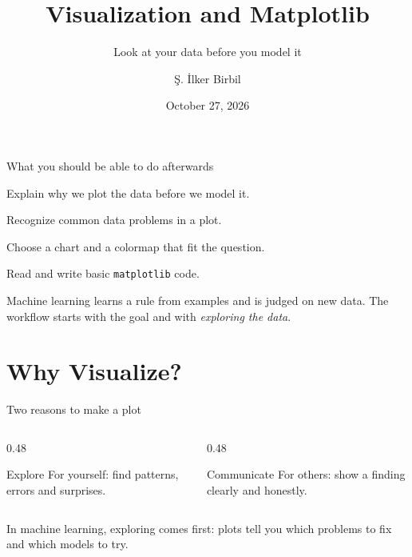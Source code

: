 \documentclass[handout,aspectratio=169,t,9pt]{beamer}
\title{Visualization and Matplotlib}
\subtitle{Look at your data before you model it}
\author{\c{S}. \.{I}lker Birbil}
\institute{University of Amsterdam}
\date{October 27, 2026}
\begin{document}

\sibtitleframe


\begin{frame}{What you should be able to do afterwards}
  \begin{objectives}
    \item Explain why we plot the data before we model it.
    \item Recognize common data problems in a plot.
    \item Choose a chart and a colormap that fit the question.
    \item Read and write basic \texttt{matplotlib} code.
  \end{objectives}

  \vfill
  \begin{recap}
    Machine learning learns a rule from examples and is judged on new data.
    The workflow starts with the goal and with \emph{exploring the data}.
  \end{recap}
\end{frame}

\section{Why Visualize?}

\begin{frame}{Two reasons to make a plot}
  \vspace{0.3cm}
  \begin{columns}[T,onlytextwidth]
    \begin{column}{0.48\textwidth}
      \begin{sibbox}{Explore}
        For yourself: find patterns, errors and surprises.
      \end{sibbox}
    \end{column}
    \begin{column}{0.48\textwidth}
      \begin{sibbox}{Communicate}
        For others: show a finding clearly and honestly.
      \end{sibbox}
    \end{column}
  \end{columns}

  \vfill
  \begin{takeaway}
    In machine learning, exploring comes first: plots tell you which
    problems to fix and which models to try.
  \end{takeaway}

\end{frame}
\end{document}
